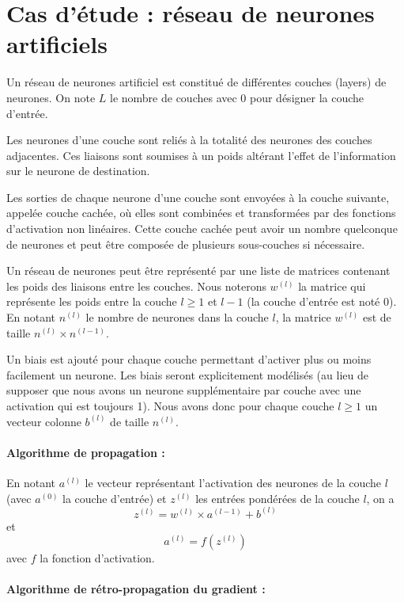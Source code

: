 \documentclass[11pt]{paper}
\begin{document}
  \section{Cas d'étude : réseau de neurones artificiels}

Un réseau de neurones artificiel est constitué de différentes couches (layers) de neurones. On note $L$ le nombre de couches avec 0 pour désigner la couche d'entrée.

Les neurones d'une couche sont reliés à la totalité des neurones des couches adjacentes. Ces liaisons sont soumises à un poids altérant l'effet de l'information sur le neurone de destination.

Les sorties de chaque neurone d'une couche sont envoyées à la couche suivante, appelée couche cachée, où elles sont combinées et transformées par des fonctions d'activation non linéaires. Cette couche cachée peut avoir un nombre quelconque de neurones et peut être composée de plusieurs sous-couches si nécessaire.

Un réseau de neurones peut être représenté par une liste de matrices contenant les poids des liaisons entre les couches. Nous noterons $w^{(l)}$ la matrice qui représente les poids entre la couche $l \geq 1$ et $l-1$ (la couche d'entrée est noté 0). En notant $n^{(l)}$ le nombre de neurones dans la couche $l$, la matrice $w^{(l)}$ est de taille $n^{(l)} \times n^{(l-1)}$.

Un biais est ajouté pour chaque couche permettant d'activer plus ou moins facilement un neurone. Les biais seront explicitement modélisés (au lieu de supposer que nous avons un neurone supplémentaire par couche avec une activation qui est toujours 1). Nous avons donc pour chaque couche $l\geq 1$ un vecteur colonne $b^{(l)}$ de taille $n^{(l)}$.

\paragraph{Algorithme de propagation :}

En notant $a^{(l)}$ le vecteur représentant l'activation des neurones de la couche $l$ (avec $a^{(0)}$ la couche d'entrée) et $z^{(l)}$ les entrées pondérées de la couche $l$, on a  $$z^{(l)} = w^{(l)} \times a^{(l-1)} + b^{(l)}$$ et  $$a^{(l)} = f \left (z^{(l)} \right)$$ avec $f$ la fonction d'activation.

\paragraph{Algorithme de rétro-propagation du gradient :}
\end{document}
